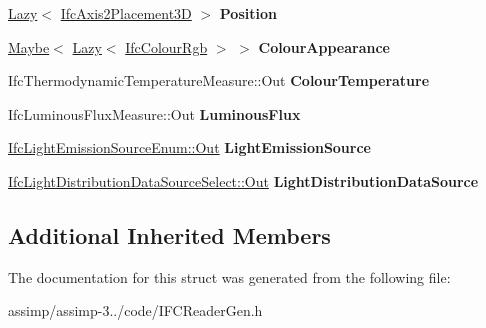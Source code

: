 \begin{DoxyCompactItemize}
\item 
\hypertarget{struct_assimp_1_1_i_f_c_1_1_ifc_light_source_goniometric_a1a873edee41232d4fbeba3ec3d56b37e}{\hyperlink{struct_assimp_1_1_s_t_e_p_1_1_lazy}{Lazy}$<$ \hyperlink{struct_assimp_1_1_i_f_c_1_1_ifc_axis2_placement3_d}{Ifc\+Axis2\+Placement3\+D} $>$ {\bfseries Position}}\label{struct_assimp_1_1_i_f_c_1_1_ifc_light_source_goniometric_a1a873edee41232d4fbeba3ec3d56b37e}

\item 
\hypertarget{struct_assimp_1_1_i_f_c_1_1_ifc_light_source_goniometric_a45eb2b484282dbd9e262775f8c43156d}{\hyperlink{struct_assimp_1_1_s_t_e_p_1_1_maybe}{Maybe}$<$ \hyperlink{struct_assimp_1_1_s_t_e_p_1_1_lazy}{Lazy}$<$ \hyperlink{struct_assimp_1_1_i_f_c_1_1_ifc_colour_rgb}{Ifc\+Colour\+Rgb} $>$ $>$ {\bfseries Colour\+Appearance}}\label{struct_assimp_1_1_i_f_c_1_1_ifc_light_source_goniometric_a45eb2b484282dbd9e262775f8c43156d}

\item 
\hypertarget{struct_assimp_1_1_i_f_c_1_1_ifc_light_source_goniometric_adb78aef56e2aa159b91279f3a05cd557}{Ifc\+Thermodynamic\+Temperature\+Measure\+::\+Out {\bfseries Colour\+Temperature}}\label{struct_assimp_1_1_i_f_c_1_1_ifc_light_source_goniometric_adb78aef56e2aa159b91279f3a05cd557}

\item 
\hypertarget{struct_assimp_1_1_i_f_c_1_1_ifc_light_source_goniometric_ad33cc3c57cd0ac7861195008e33a989b}{Ifc\+Luminous\+Flux\+Measure\+::\+Out {\bfseries Luminous\+Flux}}\label{struct_assimp_1_1_i_f_c_1_1_ifc_light_source_goniometric_ad33cc3c57cd0ac7861195008e33a989b}

\item 
\hypertarget{struct_assimp_1_1_i_f_c_1_1_ifc_light_source_goniometric_a15e83e56dc5f2628735686d6395f9b96}{\hyperlink{classboost_1_1shared__ptr}{Ifc\+Light\+Emission\+Source\+Enum\+::\+Out} {\bfseries Light\+Emission\+Source}}\label{struct_assimp_1_1_i_f_c_1_1_ifc_light_source_goniometric_a15e83e56dc5f2628735686d6395f9b96}

\item 
\hypertarget{struct_assimp_1_1_i_f_c_1_1_ifc_light_source_goniometric_ae28ebc6bae1750b5298b19633c59c7dd}{\hyperlink{classboost_1_1shared__ptr}{Ifc\+Light\+Distribution\+Data\+Source\+Select\+::\+Out} {\bfseries Light\+Distribution\+Data\+Source}}\label{struct_assimp_1_1_i_f_c_1_1_ifc_light_source_goniometric_ae28ebc6bae1750b5298b19633c59c7dd}

\end{DoxyCompactItemize}
\subsection*{Additional Inherited Members}


The documentation for this struct was generated from the following file\+:\begin{DoxyCompactItemize}
\item 
assimp/assimp-\/3../code/I\+F\+C\+Reader\+Gen.\+h\end{DoxyCompactItemize}
